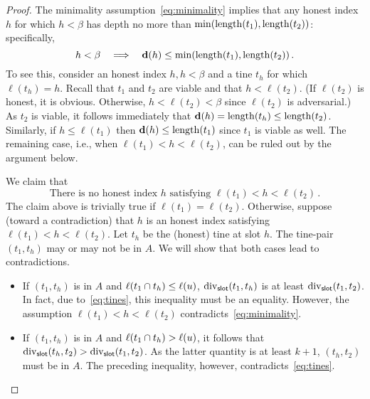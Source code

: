 \begin{proof}
    
    The minimality assumption~\eqref{eq:minimality} implies that any honest
    index $h$ for which $h < \beta$ has depth no more than
    $\min(\operatorname{length}(t_1),\operatorname{length}(t_2))$: specifically,
    \begin{equation}\label{eq:honest-depth}
      h < \beta \quad\Longrightarrow \quad \mathbf{d}(h) \leq \min(\operatorname{length}(t_1), \operatorname{length}(t_2))\,.
    \end{equation}
    To see this, consider an honest index $h,h < \beta$ and a tine $t_h$
    for which $\ell(t_h) = h$. Recall that $t_1$ and $t_2$ are viable and 
    that $h < \ell(t_2)$. (If $\ell(t_2)$ is honest, it is obvious. 
    Otherwise, $h < \ell(t_2) < \beta$ since $\ell(t_2)$ is adversarial.) 
    As $t_2$ is viable, it follows immediately that
    $\mathbf{d}(h)  = \operatorname{length}(t_h) \leq \operatorname{length}(t_2)$. 
    Similarly, if $h \leq \ell(t_1)$
    then $\mathbf{d}(h) \leq \operatorname{length}(t_1)$ since $t_1$ is viable as well. 
    The remaining case, i.e., when $\ell(t_1) < h < \ell(t_2)$, can be ruled out 
    by the argument below.

    We claim that 
    \begin{equation}\label{eq:no-honest-index}
        \text{There is no honest index $h$ satisfying $\ell(t_1) < h < \ell(t_2)$}
        \,.
    \end{equation}
    The claim above is trivially true if $\ell(t_1) = \ell(t_2)$.
    Otherwise, suppose (toward a contradiction) 
    that $h$ is an honest index satisfying $\ell(t_1) < h < \ell(t_2)$. 
    Let $t_h$ be the (honest) tine at slot $h$. 
    The tine-pair $(t_1, t_h)$ may or may not be in $A$. 
    We will show that both cases lead to contradictions.
    \begin{itemize}
      \item If $(t_1, t_h)$ is in $A$ and $\ell(t_1 \cap t_h) \leq \ell(u)$, 
      $\mathrm{div}_{\mathsf{slot}}(t_1, t_h)$ is at least $\mathrm{div}_{\mathsf{slot}}(t_1, t_2)$. 
      In fact, due to~\eqref{eq:tines}, this inequality must be an equality. 
      However, the assumption $\ell(t_1) < h < \ell(t_2)$ contradicts~\eqref{eq:minimality}. 

      \item If $(t_1, t_h)$ is in $A$ and $\ell(t_1 \cap t_h) > \ell(u)$, 
      it follows that $\mathrm{div}_{\mathsf{slot}}(t_h, t_2) > \mathrm{div}_{\mathsf{slot}}(t_1, t_2)$. 
      As the latter quantity is at least $k + 1$, $(t_h, t_2)$ must be in $A$. 
      The preceding inequality, however, contradicts~\eqref{eq:tines}.


\end{itemize}
\end{proof}
